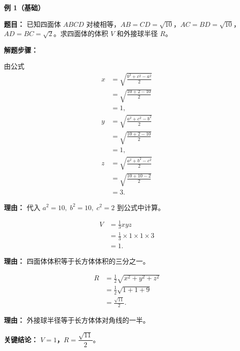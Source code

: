 \begin{examplebox}

	\textbf{\textcolor{CExample}{例 1（基础）}}

	\textbf{\textcolor{CExample}{题目：}}
	已知四面体 $ABCD$ 对棱相等，$AB=CD=\sqrt{10}$，$AC=BD=\sqrt{10}$，$AD=BC=\sqrt{2}$。求四面体的体积 $V$ 和外接球半径 $R$。

	\textbf{\textcolor{CExample}{解题步骤：}}
	\begin{description}[style=nextline, leftmargin=2.8em, labelsep=0.5em, itemsep=0.45em]
		\item[\textbf{第一步（补形求解）：}] 由公式
			\[
				\begin{aligned}
					x &= \sqrt{\frac{b^2+c^2-a^2}{2}} \\
					&= \sqrt{\frac{10+2-10}{2}} \\
					&= 1,\\
					y &= \sqrt{\frac{a^2+c^2-b^2}{2}} \\
					&= \sqrt{\frac{10+2-10}{2}} \\
					&= 1,\\
					z &= \sqrt{\frac{a^2+b^2-c^2}{2}} \\
					&= \sqrt{\frac{10+10-2}{2}} \\
					&= 3.
			\end{aligned}
			\]
			\par\textbf{理由：} 代入 $a^2=10,\;b^2=10,\;c^2=2$ 到公式中计算。
		\item[\textbf{第二步（体积公式）：}]
			\[
				\begin{aligned}
					V &= \frac13 xyz \\
					&= \frac13\times1\times1\times3 \\
					&= 1.
			\end{aligned}
			\]
			\par\textbf{理由：} 四面体体积等于长方体体积的三分之一。
		\item[\textbf{第三步（外接球半径）：}]
			\[
				\begin{aligned}
					R &= \frac12\sqrt{x^2+y^2+z^2} \\
					&= \frac12\sqrt{1+1+9} \\
					&= \frac{\sqrt{11}}{2}.
			\end{aligned}
			\]
			\par\textbf{理由：} 外接球半径等于长方体体对角线的一半。
	\end{description}

	\textbf{\textcolor{CExample}{关键结论：}}
	\textbf{$V=1$，$R=\dfrac{\sqrt{11}}{2}$}。


\end{examplebox}
